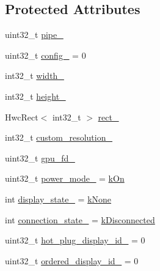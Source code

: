 \subsection*{Protected Attributes}
\begin{DoxyCompactItemize}
\item 
uint32\+\_\+t \mbox{\hyperlink{classhwcomposer_1_1PhysicalDisplay_a6e44cfaecf46642d3c0f0347e26d2d6a}{pipe\+\_\+}}
\item 
uint32\+\_\+t \mbox{\hyperlink{classhwcomposer_1_1PhysicalDisplay_a75eb0d6243de4021ad8e49141becc4a0}{config\+\_\+}} = 0
\item 
int32\+\_\+t \mbox{\hyperlink{classhwcomposer_1_1PhysicalDisplay_a87ad7236b44be5af4e29233fab50408c}{width\+\_\+}}
\item 
int32\+\_\+t \mbox{\hyperlink{classhwcomposer_1_1PhysicalDisplay_af7c7ae74664eee51055985f0035aac8c}{height\+\_\+}}
\item 
Hwc\+Rect$<$ int32\+\_\+t $>$ \mbox{\hyperlink{classhwcomposer_1_1PhysicalDisplay_aa50206430baa8d901e604787a73fe9b8}{rect\+\_\+}}
\item 
int32\+\_\+t \mbox{\hyperlink{classhwcomposer_1_1PhysicalDisplay_adac42ad60327a0ad4ebbaef554a4fafa}{custom\+\_\+resolution\+\_\+}}
\item 
uint32\+\_\+t \mbox{\hyperlink{classhwcomposer_1_1PhysicalDisplay_af0c3283a588887be1f8871ae2abd44f1}{gpu\+\_\+fd\+\_\+}}
\item 
uint32\+\_\+t \mbox{\hyperlink{classhwcomposer_1_1PhysicalDisplay_ac2f383cc7b186eab567292239c700c50}{power\+\_\+mode\+\_\+}} = \mbox{\hyperlink{hwcdefs_8h_afeed7d73a1340d1260c45cbe952c97bea67b46c19ded71fc8128a6c1f5aa361df}{k\+On}}
\item 
int \mbox{\hyperlink{classhwcomposer_1_1PhysicalDisplay_aa0a736c951942f62a8c9514548dbfa0b}{display\+\_\+state\+\_\+}} = \mbox{\hyperlink{classhwcomposer_1_1PhysicalDisplay_ae390ba5a8a0970767736459801b5d5fba926d32deff70954c6d218ea554e4b49b}{k\+None}}
\item 
int \mbox{\hyperlink{classhwcomposer_1_1PhysicalDisplay_ab51d20d93d47856931757c5cf5b6bf5d}{connection\+\_\+state\+\_\+}} = \mbox{\hyperlink{classhwcomposer_1_1PhysicalDisplay_a40c6d87f2869356fbeba00d353da2b5eab95c1164f32874d129854064fe8ac934}{k\+Disconnected}}
\item 
uint32\+\_\+t \mbox{\hyperlink{classhwcomposer_1_1PhysicalDisplay_aa76360816511c63806ef65f5ea9fd2b9}{hot\+\_\+plug\+\_\+display\+\_\+id\+\_\+}} = 0
\item 
uint32\+\_\+t \mbox{\hyperlink{classhwcomposer_1_1PhysicalDisplay_a7531be13b7e44445ec42879dc283f7d4}{ordered\+\_\+display\+\_\+id\+\_\+}} = 0

\end{DoxyCompactItemize}
